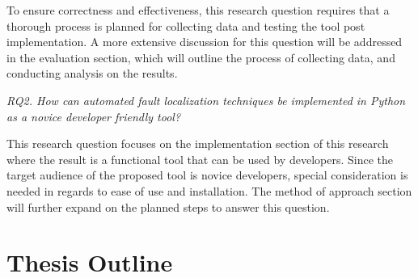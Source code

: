 To ensure correctness and effectiveness, this research question requires that a
thorough process is planned for collecting data and testing the tool post
implementation. A more extensive discussion for this question will be addressed
in the evaluation section, which will outline the process of collecting data,
and conducting analysis on the results.

\begin{center}
	\emph{RQ2. How can automated fault localization techniques be implemented in
	Python as a novice developer friendly tool?
	}
\end{center}

This research question focuses on the implementation section
of this research where the result is a functional tool that can be used by
developers. Since the target audience of the proposed tool is novice developers,
special consideration is needed in regards to ease of use and installation.
The method of approach section will further expand on the planned steps to
answer this question.

\section{Thesis Outline}
\label{sec:outline}